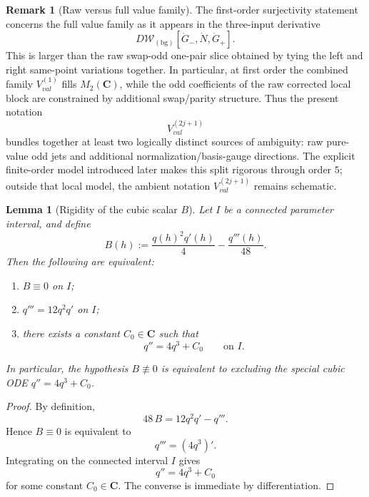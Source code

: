 \documentclass[11pt,a4paper]{amsart}
\def\val{val}%
\theoremstyle{plain}
\newtheorem{lemma}[theorem]{Lemma}
\theoremstyle{definition}
\newtheorem{remark}[theorem]{Remark}
\newcommand{\val}{\mathrm{val}}
\newcommand{\bg}{\mathrm{bg}}
\begin{document}
\begin{remark}[Raw versus full value family]
\label{rem:raw-vs-full-value-family}
The first-order surjectivity statement concerns the full value family as it
appears in the three-input derivative
\[
D\mathcal W_{(\bg)}[\dot G_-,\dot N,\dot G_+].
\]
This is larger than the raw swap-odd one-pair slice obtained by tying the left
and right same-point variations together. In particular, at first order the
combined family $V_{\val}^{(1)}$ fills $M_2(\mathbf C)$, while the odd
coefficients of the raw corrected local block are constrained by additional
swap/parity structure. Thus the present notation
\[
V_{\val}^{(2j+1)}
\]
bundles together at least two logically distinct sources of ambiguity: raw
pure-value odd jets and additional normalization/basis-gauge directions. The
explicit finite-order model introduced later makes this split rigorous through
order $5$; outside that local model, the ambient notation
$V_{\val}^{(2j+1)}$ remains schematic.
\end{remark}

\begin{lemma}[Rigidity of the cubic scalar $B$]
\label{lem:B-rigidity}
Let $I$ be a connected parameter interval, and define
\[
B(h):=\frac{q(h)^2q'(h)}{4}-\frac{q'''(h)}{48}.
\]
Then the following are equivalent:
\begin{enumerate}
\item $B\equiv 0$ on $I$;
\item $q'''=12q^2q'$ on $I$;
\item there exists a constant $C_0\in \mathbf C$ such that
\[
q''=4q^3+C_0
\qquad\text{on }I.
\]
\end{enumerate}
In particular, the hypothesis $B\not\equiv 0$ is equivalent to excluding
the special cubic ODE $q''=4q^3+C_0$.
\end{lemma}

\begin{proof}
By definition,
\[
48\,B = 12q^2q' - q'''.
\]
Hence $B\equiv 0$ is equivalent to
\[
q'''=(4q^3)'.
\]
Integrating on the connected interval $I$ gives
\[
q''=4q^3+C_0
\]
for some constant $C_0\in \mathbf C$. The converse is immediate by
differentiation.
\end{proof}
\end{document}

